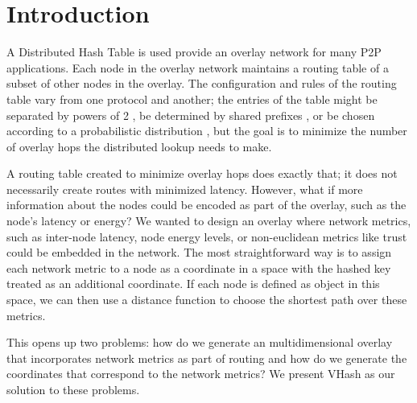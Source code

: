 \documentclass{IEEEtran}
\begin{document}
\section{Introduction}
A Distributed Hash Table is used provide an overlay network for many P2P applications. %
Each node in the overlay network maintains a routing table of a subset of other nodes in the overlay.  
The configuration and rules of the routing table vary from one protocol and another;  the entries of the table might be separated by powers of 2 \cite{Chord}, be determined by shared prefixes \cite{pastry}, or be chosen according to a probabilistic distribution \cite{kleinberg2000navigation}, but the goal is to minimize the number of overlay hops the distributed lookup needs to make. 


A routing table created to minimize overlay hops does exactly that; it does not necessarily create routes with minimized latency.  However, what if more information about the nodes could be encoded as part of the overlay, such as the node's latency or energy?  We wanted to design an overlay where network metrics, such as inter-node latency, node energy levels, or non-euclidean metrics like trust could be embedded in the network.  The most straightforward way is to assign each network metric to a node as a coordinate in a space with the hashed key treated as an additional coordinate.   If each node is defined as object in this space, we can then use a distance function to choose the shortest path over these metrics.


This opens up two problems:  how do we generate an multidimensional overlay that incorporates network metrics as part of routing and how do we generate the coordinates that correspond to the network metrics?
We present VHash as our solution to these problems.
\end{document}
